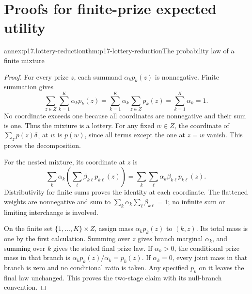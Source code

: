 \section{Proofs for finite-prize expected utility}
\label{sec:annex-p17-finite-expected-utility}

\begin{annexitem}{annex:p17.lottery-reduction}{thm:p17-lottery-reduction}{The probability law of a finite mixture}
\begin{proof}
For every prize \(z\), each summand \(\alpha_kp_k(z)\) is nonnegative.
Finite summation gives
\[
 \sum_{z\in Z}\sum_{k=1}^K\alpha_kp_k(z)
   =\sum_{k=1}^K\alpha_k\sum_{z\in Z}p_k(z)
   =\sum_{k=1}^K\alpha_k=1.
\]
No coordinate exceeds one because all coordinates are nonnegative and
their sum is one. Thus the mixture is a lottery. For any fixed \(w\in Z\),
the coordinate of \(\sum_zp(z)\delta_z\) at \(w\) is \(p(w)\), since
all terms except the one at \(z=w\) vanish. This proves the decomposition.

For the nested mixture, its coordinate at \(z\) is
\[
 \sum_k\alpha_k\left(\sum_\ell\beta_{k\ell}p_{k\ell}(z)\right)
       =\sum_k\sum_\ell\alpha_k\beta_{k\ell}p_{k\ell}(z).
\]
Distributivity for finite sums proves the identity at each coordinate.
The flattened weights are nonnegative and sum to
\(\sum_k\alpha_k\sum_\ell\beta_{k\ell}=1\); no infinite sum or
limiting interchange is involved.

On the finite set \(\{1,\ldots,K\}\times Z\), assign mass
\(\alpha_kp_k(z)\) to \((k,z)\). Its total mass is one by the first
calculation. Summing over \(z\) gives branch marginal \(\alpha_k\),
and summing over \(k\) gives the stated final prize law. If
\(\alpha_k>0\), the conditional prize mass in that branch is
\(\alpha_kp_k(z)/\alpha_k=p_k(z)\). If \(\alpha_k=0\), every joint
mass in that branch is zero and no conditional ratio is taken. Any
specified \(p_k\) on it leaves the final law unchanged. This proves
the two-stage claim with its null-branch convention.
\end{proof}
\end{annexitem}

